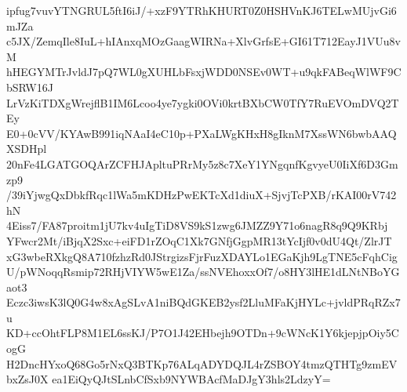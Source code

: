 ipfug7vuvYTNGRUL5ftI6iJ/+xzF9YTRhKHURT0Z0HSHVnKJ6TELwMUjvGi6mJZa
c5JX/ZemqIle8IuL+hIAnxqMOzGaagWIRNa+XlvGrfsE+GI61T712EayJ1VUu8vM
hHEGYMTrJvldJ7pQ7WL0gXUHLbFsxjWDD0NSEv0WT+u9qkFABeqWlWF9CbSRW16J
LrVzKiTDXgWrejflB1IM6Lcoo4ye7ygki0OVi0krtBXbCW0TfY7RuEVOmDVQ2TEy
E0+0cVV/KYAwB991iqNAaI4eC10p+PXaLWgKHxH8gIknM7XssWN6bwbAAQXSDHpl
20nFe4LGATGOQArZCFHJApltuPRrMy5z8c7XeY1YNgqnfKgvyeU0IiXf6D3Gmzp9
/39iYjwgQxDbkfRqc1lWa5mKDHzPwEKTcXd1diuX+SjvjTcPXB/rKAI00rV742hN
4Eiss7/FA87proitm1jU7kv4uIgTiD8VS9kS1zwg6JMZZ9Y71o6nagR8q9Q9KRbj
YFwcr2Mt/iBjqX2Sxc+eiFD1rZOqC1Xk7GNfjGgpMR13tYcIjf0v0dU4Qt/ZlrJT
xG3wbeRXkgQ8A710fzhzRd0JStrgizsFjrFuzXDAYLo1EGaKjh9LgTNE5cFqhCig
U/pWNoqqRsmip72RHjVIYW5wE1Za/ssNVEhoxxOf7/o8HY3lHE1dLNtNBoYGaot3
Eczc3iwsK3lQ0G4w8xAgSLvA1niBQdGKEB2ysf2LluMFaKjHYLc+jvldPRqRZx7u
KD+ccOhtFLP8M1EL6ssKJ/P7O1J42EHbejh9OTDn+9cWNcK1Y6kjepjpOiy5CogG
H2DncHYxoQ68Go5rNxQ3BTKp76ALqADYDQJL4rZSBOY4tmzQTHTg9zmEVbxZsJ0X
ea1EiQyQJtSLnbCfSxb9NYWBAcfMaDJgY3hls2LdzyY=
